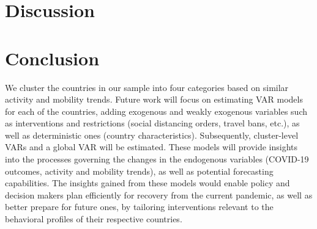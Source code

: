 \documentclass[preprint, 12pt]{elsarticle}
\newcommand{\?}{\stackrel{?}{=}}
\begin{document}
\section{Discussion}

\section{Conclusion }
We cluster the countries in our sample into four categories based on similar activity and mobility trends.
Future work will focus on estimating VAR models for each of the countries, adding exogenous and weakly exogenous variables such as interventions and restrictions (social distancing orders, travel bans, etc.), as well as deterministic ones (country characteristics).
Subsequently, cluster-level VARs and a global VAR will be estimated.
These models will provide insights into the processes governing the changes in the endogenous variables (COVID-19 outcomes, activity and mobility trends), as well as potential forecasting capabilities.
The insights gained from these models would enable policy and decision makers plan efficiently for recovery from the current pandemic, as well as better prepare for future ones, by tailoring interventions relevant to the behavioral profiles of their respective countries.
 




\end{document}
